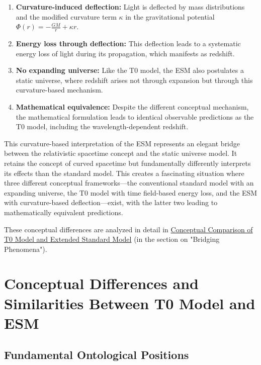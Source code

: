 \documentclass[12pt,a4paper]{article}
\begin{document}
	\begin{enumerate}
		\item \textbf{Curvature-induced deflection:} Light is deflected by mass distributions and the modified curvature term $\kappa$ in the gravitational potential $\Phi(r) = -\frac{GM}{r} + \kappa r$.
		
		\item \textbf{Energy loss through deflection:} This deflection leads to a systematic energy loss of light during its propagation, which manifests as redshift.
		
		\item \textbf{No expanding universe:} Like the T0 model, the ESM also postulates a static universe, where redshift arises not through expansion but through this curvature-based mechanism.
		
		\item \textbf{Mathematical equivalence:} Despite the different conceptual mechanism, the mathematical formulation leads to identical observable predictions as the T0 model, including the wavelength-dependent redshift.
	\end{enumerate}
	
	This curvature-based interpretation of the ESM represents an elegant bridge between the relativistic spacetime concept and the static universe model. It retains the concept of curved spacetime but fundamentally differently interprets its effects than the standard model. This creates a fascinating situation where three different conceptual frameworks—the conventional standard model with an expanding universe, the T0 model with time field-based energy loss, and the ESM with curvature-based deflection—exist, with the latter two leading to mathematically equivalent predictions.
	
	These conceptual differences are analyzed in detail in \href{https://github.com/jpascher/T0-Time-Mass-Duality/tree/main/2/pdf/English/T0vsESM_ConceptualAnalysisEn.pdf}{Conceptual Comparison of T0 Model and Extended Standard Model} (in the section on "Bridging Phenomena").
	
	\section{Conceptual Differences and Similarities Between T0 Model and ESM}
	\label{sec:conceptual_differences}
	
	\subsection{Fundamental Ontological Positions}
	\label{subsec:ontological_positions}
	
\end{document}
